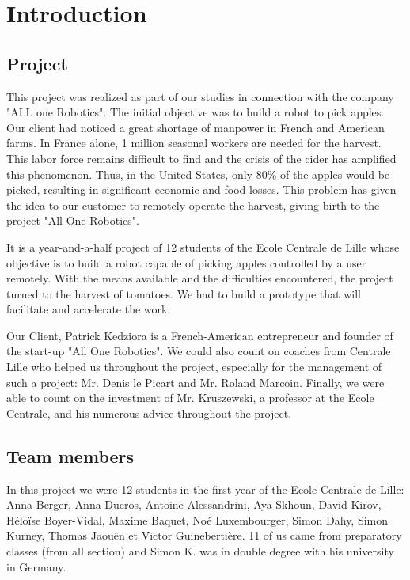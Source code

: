 \section*{Introduction}
\setcounter{figure}{0}
\label{Introduction}

\subsection*{Project}

This project was realized as part of our studies in connection with the company "ALL one Robotics". The initial objective was to build a robot to pick apples. Our client had noticed a great shortage of manpower in French and American farms. In France alone, 1 million seasonal workers are needed for the harvest. This labor force remains difficult to find and the crisis of the cider has amplified this phenomenon. Thus, in the United States, only 80\%\cite{AppleLack} of the apples would be picked, resulting in significant economic and food losses. This problem has given the idea to our customer to remotely operate the harvest, giving birth to the project "All One Robotics". 

\bigbreak
It is a year-and-a-half project of 12 students of the Ecole Centrale de Lille whose objective is to build a robot capable of picking apples controlled by a user remotely. With the means available and the difficulties encountered, the project turned to the harvest of tomatoes. We had to build a prototype that will facilitate and accelerate the work.

\bigbreak
Our Client, Patrick Kedziora is a French-American entrepreneur and founder of the start-up "All One Robotics". We could also count on coaches from Centrale Lille who helped us throughout the project, especially for the management of such a project: Mr. Denis le Picart and Mr. Roland Marcoin. Finally, we were able to count on the investment of Mr. Kruszewski, a professor at the Ecole Centrale, and his numerous advice throughout the project.

\subsection*{Team members}

In this project we were 12 students in the first year of the Ecole Centrale de Lille: Anna Berger, Anna Ducros, Antoine Alessandrini, Aya Skhoun, David Kirov, Héloïse Boyer-Vidal, Maxime Baquet, Noé Luxembourger, Simon Dahy, Simon Kurney, Thomas Jaouën et Victor Guinebertière. 11 of us came from preparatory classes (from all section) and Simon K. was in double degree with his university in Germany. 

